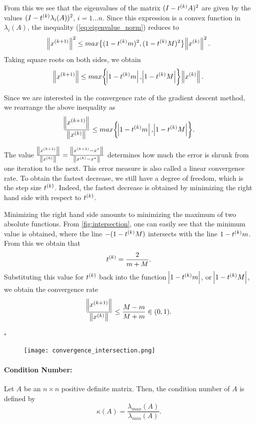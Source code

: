 \documentclass[12pt,a4paper]{article}
\begin{document}
From this we see that the eigenvalues of the matrix $(I-\kth{t}A)^2$ are given by the values $(I-\kth{t}\lambda_i(A))^2$,
$i = 1...n$. Since this expression is a convex function in $\lambda_i(A)$, the inequality (\ref{eq:eigenvalue_norm}) reduces to
$$\norm{\kth[k+1]{x}}^2 \leq max\bigl\{(1-\kth{t}m)^2, (1-\kth{t}M)^2\bigr\}\norm{\kth{x}}^2.$$
Taking square roots on both sides, we obtain
$$\norm{\kth[k+1]{x}} \leq max\biggl\{\abs{1-\kth{t}m}, \abs{1-\kth{t}M}\biggr\}\norm{\kth{x}}.$$

Since we are interested in the convergence rate of the gradient descent method, we rearrange the above inequality as
$$\frac{\norm{\kth[k+1]{x}}}{\norm{\kth{x}}} \leq max\biggl\{\abs{1-\kth{t}m}, \abs{1-\kth{t}M}\biggr\}.$$

The value $\frac{\norm{\kth[k+1]{x}}}{\norm{\kth{x}}} = \frac{\norm{\kth[k+1]{x}-x^*}}{\norm{\kth{x}-x^*}}$
determines how much the error is shrunk from one iteration to the
next. This error measure is also called a linear convergence rate. To obtain the
fastest decrease, we still have a degree of freedom, which is the step size $\kth{t}$. Indeed, the fastest
decrease is obtained by minimizing the right hand side with respect to $\kth{t}$.

Minimizing the right hand side amounts to minimizing the maximum of two absolute functions.
From \autoref{fig:intersection}, one can easily see that the
minimum value is obtained, where the line $-(1-\kth{t}M)$ intersects with the line $1-\kth{t}m$. From this we obtain that
$$\kth{t} = \frac{2}{m+M}.$$
Substituting this value for $\kth{t}$ back into the function $\abs{1-\kth{t}m}$, or $\abs{1-\kth{t}M}$, we obtain the
convergence rate
$$ \frac{\norm{\kth[k+1]{x}}}{\norm{\kth{x}}} \leq \frac{M-m}{M+m} \in (0,1).$$

	\begin{flushright}
		$\square$
	\end{flushright}
	
  \begin{figure}[htb]
    \centering
    \texttt{[image: convergence\_intersection.png]}
    \caption{\label{fig:intersection}}
  \end{figure}
  
\paragraph{Condition Number:} Let $A$ be an $n\times n$ positive definite matrix. Then, the condition
number of $A$ is defined by
$$ \kappa(A) = \frac{\lambda_{max}(A)}{\lambda_{min}(A)}.$$
\end{document}
